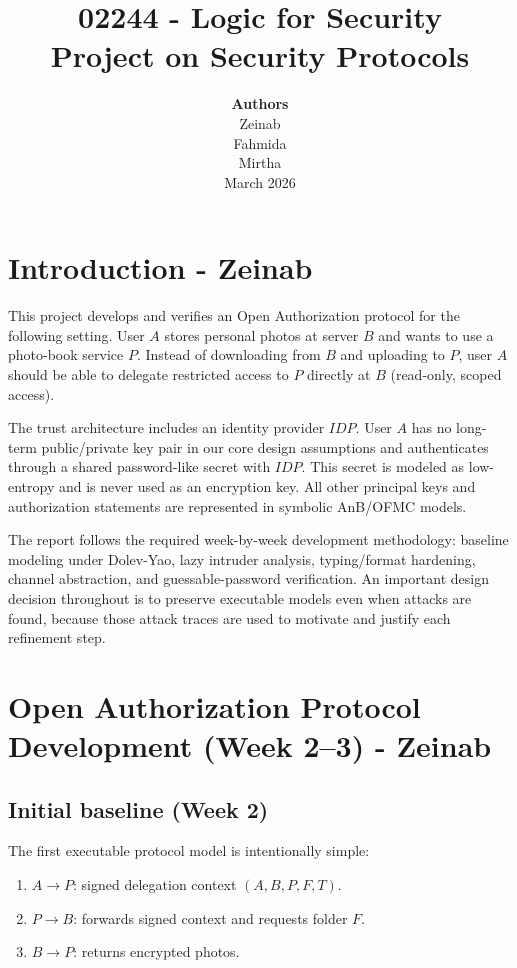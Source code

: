 \documentclass[11pt,a4paper]{article}
\title{02244 - Logic for Security\\
\vspace{0.5em}
Project on Security Protocols}
\author{%
  \textbf{Authors}\\[0.5em]
  Zeinab\\
  Fahmida\\
  Mirtha\\[1em]
  March 2026
}
\date{}
\begin{document}
\maketitle
\thispagestyle{empty}

\newpage
\tableofcontents
\newpage

\section{Introduction - Zeinab}

\noindent
This project develops and verifies an Open Authorization protocol for the following setting.
User $A$ stores personal photos at server $B$ and wants to use a photo-book service $P$.
Instead of downloading from $B$ and uploading to $P$, user $A$ should be able to delegate
restricted access to $P$ directly at $B$ (read-only, scoped access).

The trust architecture includes an identity provider $\mathit{IDP}$.
User $A$ has no long-term public/private key pair in our core design assumptions and authenticates through a shared password-like secret with $\mathit{IDP}$.
This secret is modeled as low-entropy and is never used as an encryption key.
All other principal keys and authorization statements are represented in symbolic AnB/OFMC models.

The report follows the required week-by-week development methodology:
baseline modeling under Dolev-Yao, lazy intruder analysis, typing/format hardening,
channel abstraction, and guessable-password verification.
An important design decision throughout is to preserve executable models even when attacks are found,
because those attack traces are used to motivate and justify each refinement step.

\newpage
\section{Open Authorization Protocol Development (Week 2--3) - Zeinab}

\subsection{Initial baseline (Week 2)}

The first executable protocol model is intentionally simple:
\begin{enumerate}
  \item $A \rightarrow P$: signed delegation context $(A,B,P,F,T)$.
  \item $P \rightarrow B$: forwards signed context and requests folder $F$.
  \item $B \rightarrow P$: returns encrypted photos.
\end{enumerate}
\end{document}

